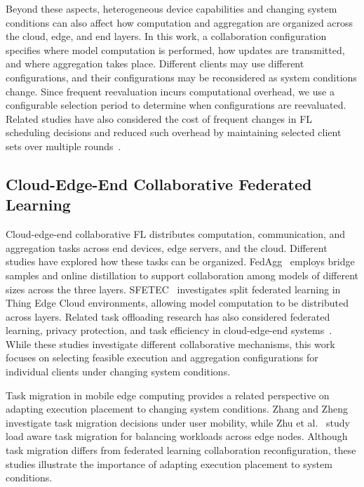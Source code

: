 \documentclass[5p,times]{elsarticle}
\theoremstyle{plain}
\theoremstyle{definition}
\theoremstyle{remark}
\begin{document}
Beyond these aspects, heterogeneous device capabilities and changing system conditions can also affect how computation and aggregation are organized across the cloud, edge, and end layers. In this work, a collaboration configuration specifies where model computation is performed, how updates are transmitted, and where aggregation takes place. Different clients may use different configurations, and their configurations may be reconsidered as system conditions change. Since frequent reevaluation incurs computational overhead, we use a configurable selection period to determine when configurations are reevaluated. Related studies have also considered the cost of frequent changes in FL
scheduling decisions and reduced such overhead by maintaining selected client
sets over multiple rounds~\cite{CHEN2026112204,10757319}.

\subsection{Cloud-Edge-End Collaborative Federated Learning}

Cloud-edge-end collaborative FL distributes computation, communication, and aggregation tasks across end devices, edge servers, and the cloud. Different studies have explored how these tasks can be organized. FedAgg~\cite{BSBODP} employs bridge samples and online distillation to support collaboration among models of different sizes across the three layers. SFETEC~\cite{SFETEC} investigates split federated learning in Thing Edge Cloud environments, allowing model computation to be distributed across layers. Related task offloading research has also considered federated learning, privacy protection, and task efficiency in cloud-edge-end systems~\cite{dong2026privacyoffloading}. While these studies investigate different collaborative mechanisms, this work focuses on selecting feasible execution and aggregation configurations for individual clients under changing system conditions.

Task migration in mobile edge computing provides a related perspective on adapting execution placement to changing system conditions. Zhang and Zheng~\cite{ZHANG2019111} investigate task migration decisions under user mobility, while Zhu et al.~\cite{ZHU2024303} study load aware task migration for balancing workloads across edge nodes. Although task migration differs from federated learning collaboration reconfiguration, these studies illustrate the importance of adapting execution placement to system conditions.
\end{document}
